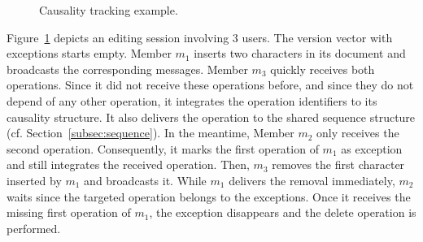 

\begin{figure}
  \centering
  
  \caption{\label{fig:timeline} Causality tracking example.}
\end{figure}

Figure~\ref{fig:timeline} depicts an editing session involving 3 users. The
version vector with exceptions starts empty. Member $m_1$ inserts two characters
in its document and broadcasts the corresponding messages. Member $m_3$ quickly
receives both operations. Since it did not receive these operations before, and
since they do not depend of any other operation, it integrates the operation
identifiers to its causality structure. It also delivers the operation to the
shared sequence structure (cf. Section~\ref{subsec:sequence}). In the meantime,
Member $m_2$ only receives the second operation. Consequently, it marks the
first operation of $m_1$ as exception and still integrates the received
operation. Then, $m_3$ removes the first character inserted by $m_1$ and
broadcasts it. While $m_1$ delivers the removal immediately, $m_2$ waits since
the targeted operation belongs to the exceptions. Once it receives the missing
first operation of $m_1$, the exception disappears and the delete operation is
performed.

